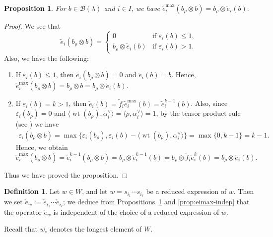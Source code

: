 \documentclass[reqno]{amsart}
\newtheorem{proposition}[theorem]{Proposition}
\theoremstyle{definition}
\newtheorem{definition}[theorem]{Definition}
\theoremstyle{remark}
\numberwithin{equation}{section}
\newcommand{\B}{\mathcal{B}}
\newcommand{\wt}{\operatorname{wt}}
\newcommand{\te}{\tilde e}
\newcommand{\tf}{\tilde f}
\newcommand{\chke}{\check e}
\newcommand{\Bl}{\B(\lambda)}
\begin{document}
	\begin{proposition}\label{prop:eimax-to-chkw}
		For $b\in\Bl$ and $i\in I$, we have
		$
		\te_i^{\max}(b_\rho\otimes b)=b_\rho\otimes\chke_i(b).
		$
	\end{proposition}
	\begin{proof}
		We see that
		\[
		\te_i(b_\rho\otimes b)=\begin{cases}0 &\text{if } \varepsilon_i(b)\le 1,\\
			b_\rho\otimes \te_i(b) &\text{if }  \varepsilon_i(b)>1.\end{cases}
		\]
		Also, we have the following:
		\begin{enumerate}
			\item[(i)] If $\varepsilon_i(b)\le 1$,
			then $\te_i(b_\rho\otimes b)=0$ and $\chke_{i}(b)=b$.
			Hence, $\te_i^{\max}(b_\rho\otimes b)=b_\rho\otimes b=b_\rho\otimes \chke_{i}(b)$.
			\item[(ii)] If $\varepsilon_i(b)=k> 1$,
			then $\chke_{i}(b)=\tf_i\te_i^{\max}(b)=\te_i^{k-1}(b)$.
			Also, since $\varepsilon_i(b_\rho)=0$ and $\langle\wt(b_\rho),\alpha_i^\vee\rangle=\langle\rho,\alpha_i^\vee\rangle=1$,
			by the tensor product rule (see \cite[\S 4.4]{hongkong})
			we have 
			\begin{align*}
				\varepsilon_i(b_\rho\otimes b)=\max\{\varepsilon_i(b_\rho),\varepsilon_i(b)-\langle\wt(b_\rho),\alpha_i^\vee\rangle\}=\max\{0,k-1\}=k-1.
			\end{align*}
			Hence, we obtain $$\te_i^{\max}(b_\rho\otimes b)=\te_i^{k-1}(b_\rho\otimes b)
			=b_\rho\otimes \te_i^{k-1}(b)=b_\rho\otimes \tf_i\te_i^{k}(b)=
			b_\rho\otimes \chke_{i}(b).$$
		\end{enumerate}
		Thus we have proved the proposition.
	\end{proof}
	
	\begin{definition}\label{def:chkw}
		Let $w\in W$, and let $w=s_{i_1}\cdots s_{i_\ell}$ be a reduced expression of $w$.
		Then we set $\chke_{w}:=\chke_{i_1}\cdots\chke_{i_\ell}$;
		we deduce from Propositions~\ref{prop:eimax-to-chkw} and \ref{prop:eimax-indep}
		that the operator $\chke_{w}$ is independent of the choice of a reduced
		expression of $w$.
	\end{definition}
	
	Recall that $w_\circ$ denotes the longest element of $W$.
	
\end{document}
